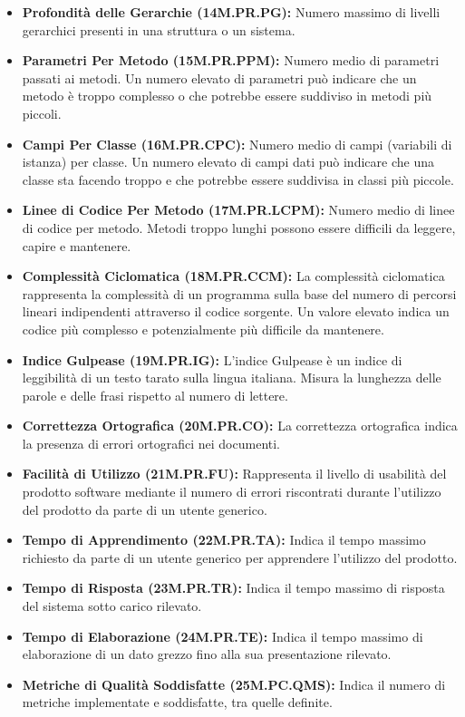 \begin{itemize}
    \item \textbf{Profondità delle Gerarchie (14M.PR.PG):} Numero massimo di livelli gerarchici presenti in una struttura o un sistema.
    \item \textbf{Parametri Per Metodo (15M.PR.PPM):} Numero medio di parametri passati ai metodi. Un numero elevato di parametri può indicare che un metodo è troppo complesso o che potrebbe essere suddiviso in metodi più piccoli.
    \item \textbf{Campi Per Classe (16M.PR.CPC):} Numero medio di campi (variabili di istanza) per classe. Un numero elevato di campi dati può indicare che una classe sta facendo troppo e che potrebbe essere suddivisa in classi più piccole.
    \item \textbf{Linee di Codice Per Metodo (17M.PR.LCPM):} Numero medio di linee di codice per metodo. Metodi troppo lunghi possono essere difficili da leggere, capire e mantenere.
    \item \textbf{Complessità Ciclomatica (18M.PR.CCM):} La complessità ciclomatica rappresenta la complessità di un programma sulla base del numero di percorsi lineari indipendenti attraverso il codice sorgente. Un valore elevato indica un codice più complesso e potenzialmente più difficile da mantenere.
    \item \textbf{Indice Gulpease (19M.PR.IG):} L'indice Gulpease è un indice di leggibilità di un testo tarato sulla lingua italiana. Misura la lunghezza delle parole e delle frasi rispetto al numero di lettere.
    \item \textbf{Correttezza Ortografica (20M.PR.CO):} La correttezza ortografica indica la presenza di errori ortografici nei documenti.
    \item \textbf{Facilità di Utilizzo (21M.PR.FU):} Rappresenta il livello di usabilità del prodotto software mediante il numero di errori riscontrati durante l'utilizzo del prodotto da parte di un utente generico.
    \item \textbf{Tempo di Apprendimento (22M.PR.TA):} Indica il tempo massimo richiesto da parte di un utente generico per apprendere l’utilizzo del prodotto.
    \item \textbf{Tempo di Risposta (23M.PR.TR):} Indica il tempo massimo di risposta del sistema sotto carico rilevato.
    \item \textbf{Tempo di Elaborazione (24M.PR.TE):} Indica il tempo massimo di elaborazione di un dato grezzo fino alla sua presentazione rilevato.
    \item \textbf{Metriche di Qualità Soddisfatte (25M.PC.QMS):} Indica il numero di metriche implementate e soddisfatte, tra quelle definite.

\end{itemize}
